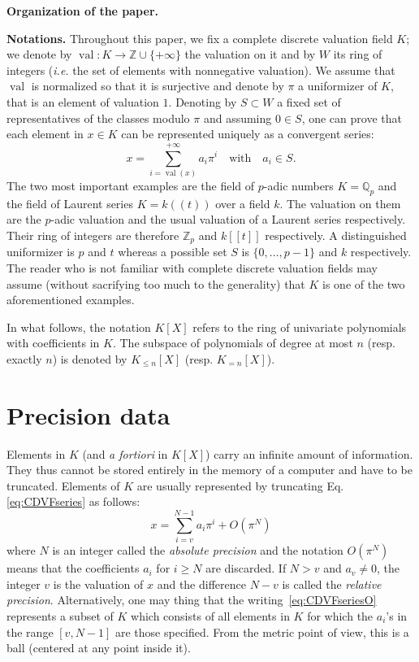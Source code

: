 \documentclass{sig-alternate-2013}
\DeclareMathOperator{\val}{val}
\newcommand{\Z}{\mathbb Z}
\newcommand{\Zp}{\Z_p}
\newcommand{\Q}{\mathbb Q}
\newcommand{\Qp}{\Q_p}
\begin{document}
\medskip

\noindent
{\bf Organization of the paper.}

\medskip

\noindent
{\bf Notations.}
Throughout this paper, we fix a complete discrete valuation field $K$; 
we denote by $\val : K \to \Z \cup \{+\infty\}$ the valuation on it and 
by $W$ its ring of integers (\emph{i.e.} the set of elements with 
nonnegative valuation). We assume that $\val$ is normalized so that it
is surjective and denote by $\pi$ a uniformizer of $K$, that is an 
element of valuation $1$. Denoting by $S \subset W$ a fixed set of 
representatives of the classes modulo $\pi$ and assuming $0 \in S$, 
one can prove that each element in $x \in K$ can be represented 
uniquely as a convergent series:
\begin{equation}
\label{eq:CDVFseries}
x = \sum_{i=\val(x)}^{+\infty} a_i \pi^i
\quad \text{with} \quad a_i \in S.
\end{equation}
The two most important examples are the field of $p$-adic numbers $K = 
\Qp$ and the field of Laurent series $K = k((t))$ over a field $k$. The 
valuation on them are the $p$-adic valuation and the usual valuation of 
a Laurent series respectively. Their ring of integers are therefore 
$\Zp$ and $k[[t]]$ respectively. A distinguished uniformizer is $p$ 
and $t$ whereas a possible set $S$ is $\{0, \ldots, p-1\}$ and $k$
respectively.
The reader who is not familiar with complete discrete valuation fields
may assume (without sacrifying too much to the generality) that $K$ is
one of the two aforementioned examples.

In what follows, the notation $K[X]$ refers to the ring of univariate 
polynomials with coefficients in $K$. The subspace of polynomials of 
degree at most $n$ (resp. exactly $n$) is denoted by $K_{\leq n}[X]$ 
(resp. $K_{=n}[X]$).

\section{Precision data}

Elements in $K$ (and \emph{a fortiori} in $K[X]$) carry an infinite 
amount of information. They thus cannot be stored entirely in the
memory of a computer and have to be truncated. Elements of $K$ are
usually represented by truncating Eq.\eqref{eq:CDVFseries} as
follows:
\begin{equation}
\label{eq:CDVFseriesO}
x = \sum_{i=v}^{N-1} a_i \pi^i + O(\pi^N)
\end{equation}
where $N$ is an integer called the \emph{absolute precision} and 
the notation $O(\pi^N)$ means that the coefficients $a_i$ for $i
\geq N$ are discarded. If $N > v$ and $a_v \neq 0$, the integer $v$ 
is the valuation of $x$ and the difference $N-v$ is called the
\emph{relative precision}.
Alternatively, one may thing that the writing~\eqref{eq:CDVFseriesO}
represents a subset of $K$ which consists of all elements in $K$ for
which the $a_i$'s in the range $[v,N-1]$ are those specified. From the
metric point of view, this is a ball (centered at any point inside it).
\end{document}
